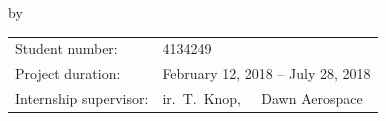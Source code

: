 \begin{titlepage}


\begin{center}


{\makeatletter
\largetitlestyle\fontsize{64}{94}\selectfont\@title
\makeatother}

{\makeatletter
\ifx\@subtitle\undefined\else
    \bigskip
   {\tudsffamily\fontsize{22}{32}\selectfont\@subtitle}    
\fi
\makeatother}

\bigskip
\bigskip

by

\bigskip
\bigskip

{\makeatletter
\largetitlestyle\fontsize{26}{26}\selectfont\@author
\makeatother}

\bigskip
\bigskip




\vfill

\begin{tabular}{lll}
    Student number: & 4134249 \\
    Project duration: & \multicolumn{2}{l}{February 12, 2018 -- July 28, 2018} \\
    Internship supervisor: & ir.\ T.\ Knop, & Dawn Aerospace \\
\end{tabular}




\end{center}
\end{titlepage}
